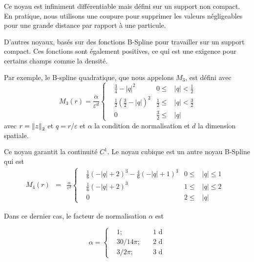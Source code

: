 Ce noyau est infiniment différentiable mais défini sur un support non compact. En pratique, nous utilisons une coupure pour supprimer les valeurs négligeables pour une grande distance par rapport à une particule.

D'autres noyaux, basés sur des fonctions B-Spline pour travailler sur un support compact. Ces fonctions sont également positives, ce qui est une exigence pour certains champs comme la densité.

Par exemple, le B-spline quadratique, que nous appelons $M_3$, est défini avec
\begin{equation}~\label{quadratic_kernel}
    M_3(r) = \frac{\alpha}{\varepsilon^d}\left\{ \begin{aligned}
         & \frac{3}{4} - |q|^2                            & 0 \leq           & |q| < \frac{1}{2} \\
         & \frac{1}{2} {\left(\frac{3}{2} - |q|\right)}^2 & \frac{1}{2} \leq & |q| < \frac{3}{2} \\
         & 0                                              & \frac{3}{2} \leq & |q|
    \end{aligned}
    \right.
\end{equation}avec $r = \left\lVert z \right\rVert_2 $ et $q = r / \varepsilon$ et $\alpha$ la condition de normalisation et $d$ la dimension spatiale.

Ce noyau garantit la continuité $C^1$.
Le noyau cubique est un autre noyau B-Spline qui est
\begin{eqnarray}~\label{cubic_kernel}
    M_4(r) &=&  \frac{\alpha}{\varepsilon^d} \left\{ \begin{aligned}
         & \frac{1}{6}{(-|q|+2)}^3 - \frac{4}{6}{(-|q|+1)}^3 & 0 \leq      & |q| \leq  1 & \\
         & \frac{1}{6}{(- |q|+2)}^3                          & 1      \leq & |q| \leq 2  & \\
         & 0                                                 & 2 \leq      & |q|
    \end{aligned}
    \right.
\end{eqnarray}

Dans ce dernier cas, le facteur de normalisation $\alpha$ est

\begin{equation*}
    \alpha = \left\{ \begin{aligned}
         & 1;    \quad      & 1\text{ d} \\
         & 30/14 \pi; \quad & 2\text{ d} \\
         & 3/ 2\pi; \quad   & 3\text{ d}
    \end{aligned}
    \right.
\end{equation*}

